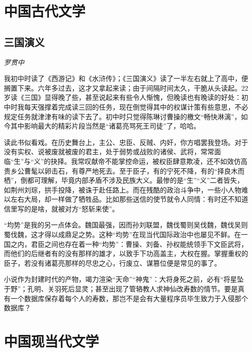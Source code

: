 
\section{中国古代文学}

\subsection*{三国演义}
\par \emph{罗贯中} 
\par 我初中时读了《西游记》和《水浒传》；《三国演义》读了一半左右就上了高中，便搁置下来。六年多过去，这才又拿起来读；由于间隔时间太久，干脆从头读起。22岁读《三国》显得晚了些，甚至说起来有些令人惭愧，但晚读也有晚读的好处：初中时我每天强撑着完成读三回的任务，现在倒觉得其中的权谋计策有些意思，不必规定任务就津津有味的读下去了。初中时只觉得陈琳讨曹操的檄文“畅快淋漓”，如今其中影响最大的精彩片段当然是“诸葛亮骂死王司徒”了，哈哈。
\par 读此书似看戏。在历史舞台上，主公、忠臣、反贼、内奸，你方唱罢我登场。对于没有实权、说被废就被废的君主，处于弱势或战败的诸侯、武将，常常面临“生”与“义”的抉择。我常叹献帝不能掌控命运，被权臣肆意欺凌，还不如效仿高贵乡公曹髦以卵击石，有尊严地死去。至于臣子，有的宁死不降，有的“择良木而栖”，倒都可理解，毕竟内部矛盾不涉及民族大义。最惨的是“生”“义”二者皆失，如荆州刘琮，拱手投降，被诛于赴任路上。而在残酷的政治斗争中，一些小人物难以左右大局，却一样做了牺牲品。比如那些送信的使节就令人同情：有时还不知道信里写的是啥，就被对方“怒斩来使”。
\par “均势”是我的另一点体会。魏国最强，因而孙刘联盟，魏伐蜀则吴伐魏，魏伐吴则蜀伐魏，这才得以成鼎足之势。这种“均势”在现当代国际政治中也屡见不鲜。在一国之内，君臣之间也存在着一种“均势”：曹操、刘备、孙权能统领手下文臣武将，而他们的后继者有的没有那样的雄才，以致手下功高盖主，大权在握。掌握重权的臣子，若没有诸葛亮那样的尽忠之心，行废立、谋篡位便是常见的事了。
\par 小说作为封建时代的产物，竭力渲染“天命”“神鬼”：大将身死之前，必有“将星坠于野”；孔明、关羽死后显灵；甚至出现了管辂教人求神仙改寿数的情节。要是真有一个数据库保存着每个人的寿数，那岂不是会有大量程序员毕生致力于入侵那个数据库？
\par {}

\section{中国现当代文学}

